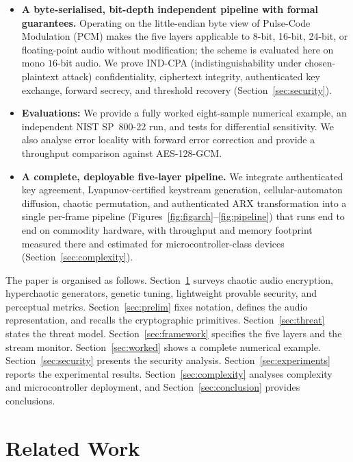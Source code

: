 \documentclass[pdflatex,sn-mathphys-num]{sn-jnl}%
\theoremstyle{thmstyleone}%
\theoremstyle{thmstyletwo}%
\theoremstyle{thmstylethree}%
\begin{document}
\begin{itemize}[leftmargin=1.4em]
\item[\textbf{C4}] \textbf{A byte-serialised, bit-depth independent pipeline with formal guarantees.} Operating on the little-endian byte view of Pulse-Code Modulation (PCM) makes the five layers applicable to 8-bit, 16-bit, 24-bit, or floating-point audio without modification; the scheme is evaluated here on mono $16$-bit audio. We prove IND-CPA (indistinguishability under chosen-plaintext attack) confidentiality, ciphertext integrity, authenticated key exchange, forward secrecy, and threshold recovery (Section~\ref{sec:security}).

\item[\textbf{C5}] \textbf{Evaluations:} We provide a fully worked eight-sample numerical example, an independent NIST SP~800-22 run, and tests for differential sensitivity. We also analyse error locality with forward error correction and provide a throughput comparison against AES-128-GCM.

\item[\textbf{C6}] \textbf{A complete, deployable five-layer pipeline.} We integrate authenticated key agreement, Lyapunov-certified keystream generation, cellular-automaton diffusion, chaotic permutation, and authenticated ARX transformation into a single per-frame pipeline (Figures~\ref{fig:figarch}--\ref{fig:pipeline}) that runs end to end on commodity hardware, with throughput and memory footprint measured there and estimated for microcontroller-class devices (Section~\ref{sec:complexity}).
\end{itemize}

The paper is organised as follows. Section~\ref{sec:related} surveys chaotic audio encryption, hyperchaotic generators, genetic tuning, lightweight provable security, and perceptual metrics. Section~\ref{sec:prelim} fixes notation, defines the audio representation, and recalls the cryptographic primitives. Section~\ref{sec:threat} states the threat model. Section~\ref{sec:framework} specifies the five layers and the stream monitor. Section~\ref{sec:worked} shows a complete numerical example. Section~\ref{sec:security} presents the security analysis. Section~\ref{sec:experiments} reports the experimental results. Section~\ref{sec:complexity} analyses complexity and microcontroller deployment, and Section~\ref{sec:conclusion} provides conclusions.


\section{Related Work}
\label{sec:related}
\end{document}

